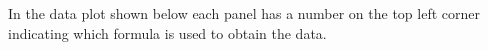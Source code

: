 \documentclass[11pt,letter]{article}
\newcommand{\bv}[1]{\ensuremath{\bm{#1}}}
\newcommand{\iq}{\ensuremath{i_{\bv{Q}} }}
\newcommand{\iqma}{\ensuremath{i_{\bv{Q}_{\text{MA}}} }}
\newcommand{\jqma}{\ensuremath{j_{\bv{Q}_{\text{MA}}} }}
\newcommand{\ipith}{\ensuremath{i_{\bv{\pi}/\bv{\theta}}}}
\newcommand{\ima}[1]{\ensuremath{i_{\bv{#1}_{\text{MA}}} }}
\newcommand{\jma}[1]{\ensuremath{j_{\bv{#1}_{\text{MA}}} }}
\begin{document}

In the data plot shown below each panel has a number on the top left corner
indicating which formula is used to obtain the data.  
\end{document}
